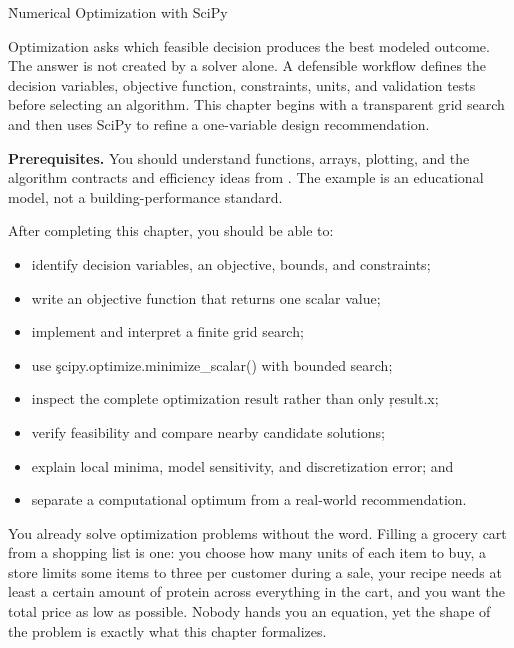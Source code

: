
\h{Numerical Optimization with SciPy}
\label{ch:17}

Optimization asks which feasible decision produces the best modeled outcome.
The answer is not created by a solver alone. A defensible workflow defines the
decision variables, objective function, constraints, units, and validation
tests before selecting an algorithm. This chapter begins with a transparent
grid search and then uses SciPy to refine a one-variable design recommendation.

\begin{NoteBox}
\textbf{Prerequisites.} You should understand functions, arrays, plotting, and
the algorithm contracts and efficiency ideas from .
The example is an educational model, not a building-performance standard.
\end{NoteBox}

\begin{tcolorbox}[title=Learning outcomes,colframe=orange,colback=white,arc=2mm]
After completing this chapter, you should be able to:
\begin{itemize}
    \item identify decision variables, an objective, bounds, and constraints;
    \item write an objective function that returns one scalar value;
    \item implement and interpret a finite grid search;
    \item use \c{scipy.optimize.minimize_scalar()} with bounded search;
    \item inspect the complete optimization result rather than only \c{result.x};
    \item verify feasibility and compare nearby candidate solutions;
    \item explain local minima, model sensitivity, and discretization error; and
    \item separate a computational optimum from a real-world recommendation.
\end{itemize}
\end{tcolorbox}


You already solve optimization problems without the word. Filling a grocery
cart from a shopping list is one: you choose how many units of each item to
buy, a store limits some items to three per customer during a sale, your
recipe needs at least a certain amount of protein across everything in the
cart, and you want the total price as low as possible. Nobody hands you an
equation, yet the shape of the problem is exactly what this chapter formalizes.

